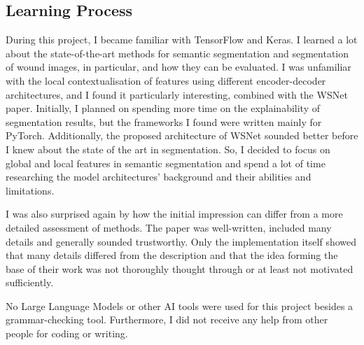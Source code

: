 \subsection{Learning Process}

During this project, I became familiar with TensorFlow and Keras. I learned a lot about the state-of-the-art methods for semantic segmentation and segmentation of wound images, in particular, and how they can be evaluated. I was unfamiliar with the local contextualisation of features using different encoder-decoder architectures, and I found it particularly interesting, combined with the WSNet paper. Initially, I planned on spending more time on the explainability of segmentation results, but the frameworks I found were written mainly for PyTorch. Additionally, the proposed architecture of WSNet sounded better before I knew about the state of the art in segmentation. So, I decided to focus on global and local features in semantic segmentation and spend a lot of time researching the model architectures' background and their abilities and limitations.

I was also surprised again by how the initial impression can differ from a more detailed assessment of methods. The paper was well-written, included many details and generally sounded trustworthy. Only the implementation itself showed that many details differed from the description and that the idea forming the base of their work was not thoroughly thought through or at least not motivated sufficiently.

No Large Language Models or other AI tools were used for this project besides a grammar-checking tool. Furthermore, I did not receive any help from other people for coding or writing.